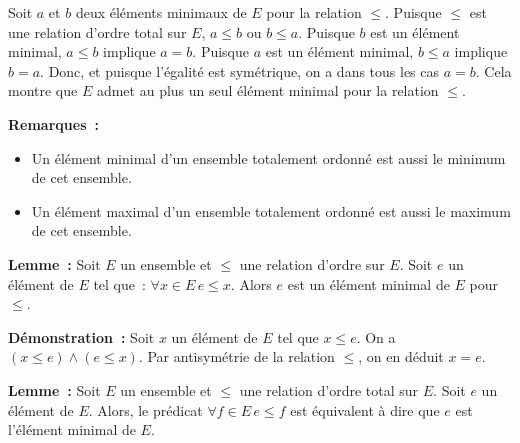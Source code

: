     Soit $a$ et $b$ deux éléments minimaux de $E$ pour la relation $\leq$.
    Puisque $\leq$ est une relation d'ordre total sur $E$, $a \leq b$ ou $b \leq a$. 
    Puisque $b$ est un élément minimal, $a \leq b$ implique $a = b$.
    Puisque $a$ est un élément minimal, $b \leq a$ implique $b = a$.
    Donc, et puisque l'égalité est symétrique, on a dans tous les cas $a = b$.
    Cela montre que $E$ admet au plus un seul élément minimal pour la relation $\leq$.

   \done 

\medskip

\noindent \textbf{Remarques :} 
\begin{itemize}[nosep]
    \item Un élément minimal d'un ensemble totalement ordonné est aussi le minimum de cet ensemble.
    \item Un élément maximal d'un ensemble totalement ordonné est aussi le maximum de cet ensemble.
\end{itemize}

\medskip

\noindent\textbf{Lemme :} Soit $E$ un ensemble et $\leq$ une relation d'ordre sur $E$. 
    Soit $e$ un élément de $E$ tel que : $\forall x \in E \, e \leq x$. 
    Alors $e$ est un élément minimal de $E$ pour $\leq$.

\medskip

\noindent\textbf{Démonstration :} 
    Soit $x$ un élément de $E$ tel que $x \leq e$. 
    On a $(x \leq e) \wedge (e \leq x)$. 
    Par antisymétrie de la relation $\leq$, on en déduit $x = e$.

   \done 

\medskip

\noindent\textbf{Lemme :} Soit $E$ un ensemble et $\leq$ une relation d'ordre total sur $E$. 
    Soit $e$ un élément de $E$.
    Alors, le prédicat $\forall f \in E \, e \leq f$ est équivalent à dire que $e$ est l'élément minimal de $E$.

\medskip

